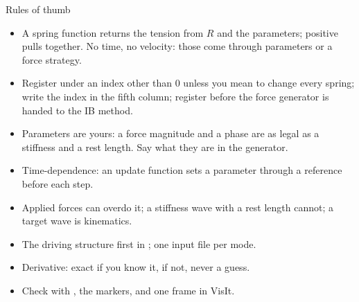 \documentclass[aspectratio=169,11pt]{beamer}
\begin{document}
\begin{frame}{Rules of thumb}
\label{fr:thumb}
\small
\begin{itemize}
  \item A spring function returns the tension from $R$ and the parameters; positive pulls together. No time, no velocity: those come through parameters or a force strategy.
  \item Register under an index other than 0 unless you mean to change every spring; write the index in the fifth column; register before the force generator is handed to the IB method.
  \item Parameters are yours: a force magnitude and a phase are as legal as a stiffness and a rest length. Say what they are in the generator.
  \item Time-dependence: an update function sets a parameter through a reference before each step.
  \item Applied forces can overdo it; a stiffness wave with a rest length cannot; a target wave is kinematics.
  \item The driving structure first in ; one input file per mode.
  \item Derivative: exact if you know it,  if not, never a guess.
  \item Check with , the markers, and one frame in VisIt.
\end{itemize}
\end{frame}
\end{document}
